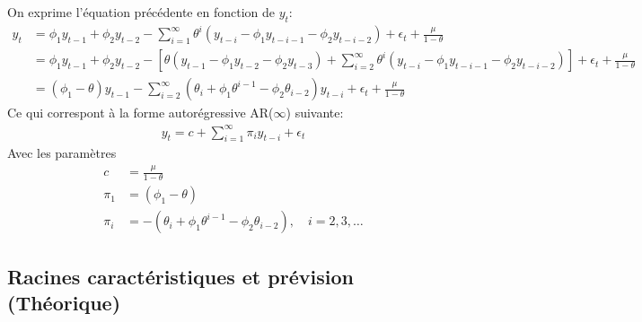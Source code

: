 \documentclass{article}
\begin{document}
\begin{enumerate}
  On exprime l'équation précédente en fonction de $y_t$:
  \begin{align*}
    y_t &= \phi_1 y_{t-1} + \phi_2 y_{t-2} - \sum_{i=1}^{\infty} \theta^i \left(y_{t-i} - \phi_1 y_{t-i-1} - \phi_2 y_{t-i-2} \right) + \epsilon_t + \frac{\mu}{1-\theta} \\
    &= \phi_1 y_{t-1} + \phi_2 y_{t-2} - \left[\theta\left(y_{t-1}-\phi_1 y_{t-2} - \phi_2 y_{t-3} \right) + \sum_{i=2}^{\infty} \theta^i \left(y_{t-i} - \phi_1 y_{t-i-1} - \phi_2 y_{t-i-2} \right)\right] + \epsilon_t + \frac{\mu}{1-\theta}  \\
    &= (\phi_1 - \theta) y_{t-1} - \sum_{i=2}^{\infty} \left(\theta_i+\phi_1\theta^{i-1} - \phi_2\theta_{i-2}\right) y_{t-i} + \epsilon_t + \frac{\mu}{1-\theta}
  \end{align*}
  Ce qui correspont à la forme autorégressive AR($\infty$) suivante:
  \begin{align*}
    y_t = c + \sum_{i=1}^{\infty} \pi_i y_{t-i} + \epsilon_t
  \end{align*}
  Avec les paramètres
  \begin{align*}
    c &= \frac{\mu}{1-\theta} \\
    \pi_1 &= (\phi_1 - \theta) \\
    \pi_i &= -\left(\theta_i+\phi_1\theta^{i-1} - \phi_2\theta_{i-2}\right),\quad i=2,3,\ldots
  \end{align*}
  
\end{enumerate}

\subsection{Racines caractéristiques et prévision (Théorique)}
\end{document}

